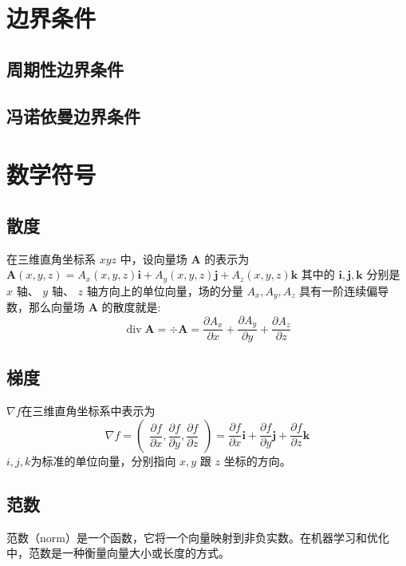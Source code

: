\documentclass{article}
\numberwithin{equation}{subsection}    %
\begin{document}
\begin{appendix}
    \section{边界条件}
    \subsection{周期性边界条件}
    \subsection{冯诺依曼边界条件}
    \section{数学符号}
    \subsection{散度}
    在三维直角坐标系  $x y z$  中，设向量场  $\boldsymbol{A}$  的表示为
    $\boldsymbol{A}(x, y, z)=A_{x}(x, y, z) \boldsymbol{i}+A_{y}(x, y, z) \boldsymbol{j}+A_{z}(x, y, z) \boldsymbol{k}$ 其中的  $\boldsymbol{i}, \boldsymbol{j}, \boldsymbol{k} $ 分别是  $x$  轴、  $y$  轴、  $z$  轴方向上的单位向量，场的分量  $A_{x}, A_{y}, A_{z}$  具有一阶连续偏导数，那么向量场  $\boldsymbol{A}$  的散度就是:
    \begin{equation}
        \operatorname{div} \boldsymbol{A}=\div \boldsymbol{A}=\dfrac{\partial A_{x}}{\partial x}+\dfrac{\partial A_{y}}{\partial y}+\dfrac{\partial A_{z}}{\partial z}
    \end{equation}
    \subsection{梯度}
    $\nabla f$在三维直角坐标系中表示为
    \begin{equation}
        {\displaystyle \nabla f={\begin{pmatrix}{\dfrac {\partial f}{\partial x}},{\dfrac {\partial f}{\partial y}},{\dfrac {\partial f}{\partial z}}\end{pmatrix}}={\dfrac {\partial f}{\partial x}}\mathbf {i} +{\dfrac {\partial f}{\partial y}}\mathbf {j} +{\dfrac {\partial f}{\partial z}}\mathbf {k} }
    \end{equation}
    $i, j, k $为标准的单位向量，分别指向 $x, y$ 跟 $z$ 坐标的方向。
    \subsection{范数}
    范数（norm）是一个函数，它将一个向量映射到非负实数。在机器学习和优化中，范数是一种衡量向量大小或长度的方式。


\end{appendix}
\end{document}
